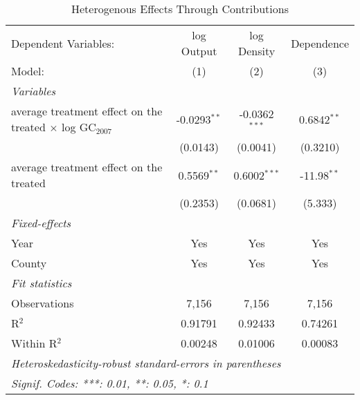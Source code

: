 
\begin{table}[htbp]
   \caption{Heterogenous Effects Through Contributions}
   \centering
   \begin{adjustbox}{max width = \textwidth, center}
      \begin{tabular}{lccc}
         \tabularnewline \midrule \midrule
         Dependent Variables:                                              & log Output     & log Density     & Dependence\\  
         Model:                                                            & (1)            & (2)             & (3)\\  
         \midrule
         \emph{Variables}\\
         average treatment effect on the treated $\times$ log GC$_{2007}$  & -0.0293$^{**}$ & -0.0362$^{***}$ & 0.6842$^{**}$\\   
                                                                           & (0.0143)       & (0.0041)        & (0.3210)\\   
         average treatment effect on the treated                           & 0.5569$^{**}$  & 0.6002$^{***}$  & -11.98$^{**}$\\   
                                                                           & (0.2353)       & (0.0681)        & (5.333)\\   
         \midrule
         \emph{Fixed-effects}\\
         Year                                                              & Yes            & Yes             & Yes\\  
         County                                                            & Yes            & Yes             & Yes\\  
         \midrule
         \emph{Fit statistics}\\
         Observations                                                      & 7,156          & 7,156           & 7,156\\  
         R$^2$                                                             & 0.91791        & 0.92433         & 0.74261\\  
         Within R$^2$                                                      & 0.00248        & 0.01006         & 0.00083\\  
         \midrule \midrule
         \multicolumn{4}{l}{\emph{Heteroskedasticity-robust standard-errors in parentheses}}\\
         \multicolumn{4}{l}{\emph{Signif. Codes: ***: 0.01, **: 0.05, *: 0.1}}\\
      \end{tabular}
   \end{adjustbox}
\end{table}


